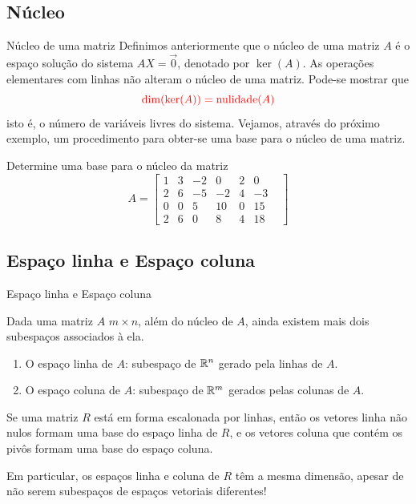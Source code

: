 \subsection*{Núcleo}
\begin{frame}[label=lild]{Núcleo de uma matriz}
Definimos anteriormente que o {\color{blue}núcleo} de uma matriz $A$ é o espaço solução do sistema $AX=\vec{0}$, denotado por {\color{blue}$\ker(A)$}. {\color{blue}As operações elementares com linhas não alteram o núcleo de uma matriz}. Pode-se mostrar que 
\[{\color{red}\dim(\ker(A))=\operatorname{nulidade}(A)}\]
isto é, o número de variáveis livres do sistema. 
Vejamos, através do próximo exemplo, um procedimento para obter-se uma base para o núcleo de uma matriz.

\begin{exe}
Determine uma base para o núcleo da matriz
\[
A=\begin{bmatrix}
1 & 3 & -2 & 0 & 2 & 0\\
2 & 6 & -5 & -2& 4& -3& \\
0 & 0& 5& 10& 0 & 15\\
2 & 6& 0&  8& 4& 18
\end{bmatrix}
\]
\end{exe}


\end{frame}

\subsection*{Espaço linha e Espaço coluna}
\begin{frame}[label=lild]{Espaço linha e Espaço coluna}

Dada uma matriz $A$  $m\times n$, além do núcleo de $A$, ainda existem mais dois subespaços associados à ela.
\begin{enumerate}
\item {\color{blue}O espaço linha de $A$}: subespaço de $\mathbb{R}^n$ gerado pela linhas de $A$.
\item {\color{blue}O espaço coluna de $A$}: subespaço de $\mathbb{R}^m$ gerados pelas colunas de $A$.
\end{enumerate}

\begin{teo}
Se uma matriz {\color{red}$R$ está em forma escalonada por linhas}, então os vetores linha não nulos formam uma base do espaço linha de $R$, e os vetores coluna que contém os pivôs formam uma base do espaço coluna. 
\end{teo}

\begin{exampleblock}{}
Em particular, os espaços linha e coluna de $R$ têm a mesma dimensão, apesar de não serem  subespaços de espaços vetoriais diferentes!
\end{exampleblock}

\end{frame}



